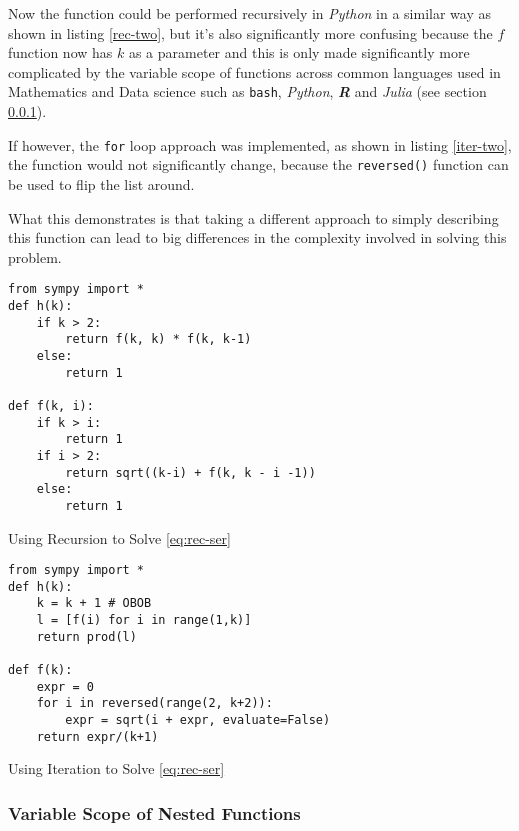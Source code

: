 \documentclass[11pt]{article}
\begin{document}
Now the function could be performed recursively in \emph{Python} in a similar
way as shown in listing \ref{rec-two}, but it's also significantly more confusing because the \(f\) function now has \(k\) as a parameter and this is only made significantly more complicated by the variable scope of functions across common languages used in Mathematics and Data science such as \texttt{bash}, \emph{Python}, \textbf{\emph{R}} and \emph{Julia} (see section \ref{variable-scope-nested}).


If however, the \texttt{for} loop approach was implemented, as shown in listing
\ref{iter-two}, the function would not significantly change, because the \texttt{reversed()} function can be
used to flip the list around.

What this demonstrates is that taking a different approach to simply describing
this function can lead to big differences in the complexity involved in solving
this problem.

\begin{listing}[htbp]
\begin{verbatim}
from sympy import *
def h(k):
    if k > 2:
        return f(k, k) * f(k, k-1)
    else:
        return 1

def f(k, i):
    if k > i:
        return 1
    if i > 2:
        return sqrt((k-i) + f(k, k - i -1))
    else:
        return 1
\end{verbatim}
\caption{\label{rec-two}Using Recursion to Solve \eqref{eq:rec-ser}}
\end{listing}


\begin{listing}[htbp]
\begin{verbatim}
from sympy import *
def h(k):
    k = k + 1 # OBOB
    l = [f(i) for i in range(1,k)]
    return prod(l)

def f(k):
    expr = 0
    for i in reversed(range(2, k+2)):
        expr = sqrt(i + expr, evaluate=False)
    return expr/(k+1)
\end{verbatim}
\caption{\label{iter-two}Using Iteration to Solve \eqref{eq:rec-ser}}
\end{listing}

\subsubsection{Variable Scope of Nested Functions}
\label{variable-scope-nested}
\end{document}
